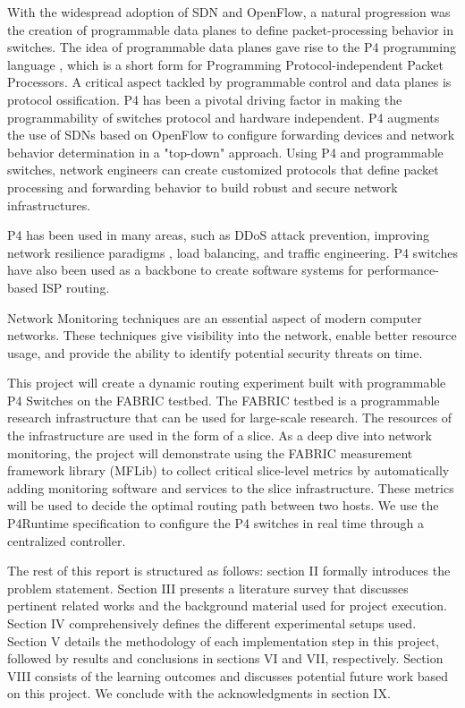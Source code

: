 \documentclass[conference]{IEEEtran}
\begin{document}
    With the widespread adoption of SDN and OpenFlow, a natural progression was the creation of programmable data planes to define packet-processing behavior in switches. The idea of programmable data planes gave rise to the P4 programming language \cite{b1}, which is a short form for Programming Protocol-independent Packet Processors. A critical aspect tackled by programmable control and data planes is protocol ossification. P4 has been a pivotal driving factor in making the programmability of switches protocol and hardware independent. P4 augments the use of SDNs based on OpenFlow to configure forwarding devices and network behavior determination in a "top-down" approach. Using P4 and programmable switches, network engineers can create customized protocols that define packet processing and forwarding behavior to build robust and secure network infrastructures.

    P4 has been used in many areas, such as DDoS attack prevention, improving network resilience paradigms \cite{b2}, load balancing, and traffic engineering. P4 switches have also been used as a backbone to create software systems for performance-based ISP routing.

    Network Monitoring techniques are an essential aspect of modern computer networks. These techniques give visibility into the network, enable better resource usage, and provide the ability to identify potential security threats on time.

    This project will create a dynamic routing experiment built with programmable P4 Switches on the FABRIC testbed. The FABRIC testbed is a programmable research infrastructure that can be used for large-scale research. The resources of the infrastructure are used in the form of a slice. As a deep dive into network monitoring, the project will demonstrate using the FABRIC measurement framework library (MFLib) \cite{b3} to collect critical slice-level metrics by automatically adding monitoring software and services to the slice infrastructure. These metrics will be used to decide the optimal routing path between two hosts. We use the P4Runtime specification to configure the P4 switches in real time through a centralized controller.

    The rest of this report is structured as follows: section II formally introduces the problem statement. Section III presents a literature survey that discusses pertinent related works and the background material used for project execution. Section IV comprehensively defines the different experimental setups used. Section V details the methodology of each implementation step in this project, followed by results and conclusions in sections VI and VII, respectively. Section VIII consists of the learning outcomes and discusses potential future work based on this project. We conclude with the acknowledgments in section IX.
\end{document}
